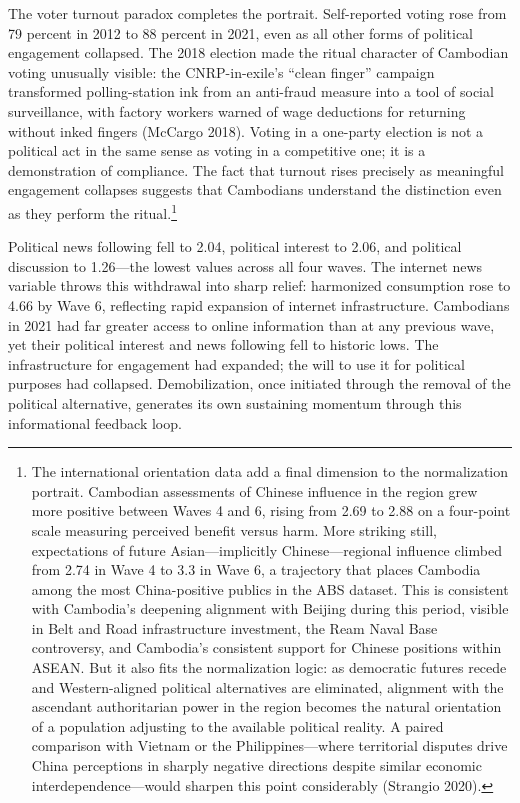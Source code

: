 \documentclass[
  12pt,
  letterpaper]{article}
\begin{document}
The voter turnout paradox completes the portrait. Self-reported voting
rose from 79 percent in 2012 to 88 percent in 2021, even as all other
forms of political engagement collapsed. The 2018 election made the
ritual character of Cambodian voting unusually visible: the
CNRP-in-exile's ``clean finger'' campaign transformed polling-station
ink from an anti-fraud measure into a tool of social surveillance, with
factory workers warned of wage deductions for returning without inked
fingers (McCargo 2018). Voting in a one-party election is not a
political act in the same sense as voting in a competitive one; it is a
demonstration of compliance. The fact that turnout rises precisely as
meaningful engagement collapses suggests that Cambodians understand the
distinction even as they perform the ritual.\footnote{The international
  orientation data add a final dimension to the normalization portrait.
  Cambodian assessments of Chinese influence in the region grew more
  positive between Waves 4 and 6, rising from 2.69 to 2.88 on a
  four-point scale measuring perceived benefit versus harm. More
  striking still, expectations of future Asian---implicitly
  Chinese---regional influence climbed from 2.74 in Wave 4 to 3.3 in
  Wave 6, a trajectory that places Cambodia among the most
  China-positive publics in the ABS dataset. This is consistent with
  Cambodia's deepening alignment with Beijing during this period,
  visible in Belt and Road infrastructure investment, the Ream Naval
  Base controversy, and Cambodia's consistent support for Chinese
  positions within ASEAN. But it also fits the normalization logic: as
  democratic futures recede and Western-aligned political alternatives
  are eliminated, alignment with the ascendant authoritarian power in
  the region becomes the natural orientation of a population adjusting
  to the available political reality. A paired comparison with Vietnam
  or the Philippines---where territorial disputes drive China
  perceptions in sharply negative directions despite similar economic
  interdependence---would sharpen this point considerably (Strangio
  2020).}

Political news following fell to 2.04, political interest to 2.06, and
political discussion to 1.26---the lowest values across all four waves.
The internet news variable throws this withdrawal into sharp relief:
harmonized consumption rose to 4.66 by Wave 6, reflecting rapid
expansion of internet infrastructure. Cambodians in 2021 had far greater
access to online information than at any previous wave, yet their
political interest and news following fell to historic lows. The
infrastructure for engagement had expanded; the will to use it for
political purposes had collapsed. Demobilization, once initiated through
the removal of the political alternative, generates its own sustaining
momentum through this informational feedback loop.
\end{document}
